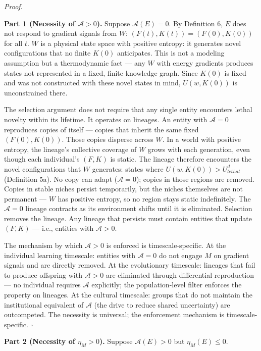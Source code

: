 \documentclass[
]{article}
\begin{document}
\emph{Proof.}

\textbf{Part 1 (Necessity of \(\mathcal{A} > 0\)).} Suppose
\(\mathcal{A}(E) = 0\). By Definition 6, \(E\) does not respond to
gradient signals from \(W\): \((F(t), K(t)) = (F(0), K(0))\) for all
\(t\). \(W\) is a physical state space with positive entropy: it
generates novel configurations that no finite \(K(0)\) anticipates. This
is not a modeling assumption but a thermodynamic fact --- any \(W\) with
energy gradients produces states not represented in a fixed, finite
knowledge graph. Since \(K(0)\) is fixed and was not constructed with
these novel states in mind, \(U(w, K(0))\) is unconstrained there.

The selection argument does not require that any single entity
encounters lethal novelty within its lifetime. It operates on lineages.
An entity with \(\mathcal{A} = 0\) reproduces copies of itself ---
copies that inherit the same fixed \((F(0), K(0))\). Those copies
disperse across \(W\). In a world with positive entropy, the lineage's
collective coverage of \(W\) grows with each generation, even though
each individual's \((F, K)\) is static. The lineage therefore encounters
the novel configurations that \(W\) generates: states where
\(U(w, K(0)) > U_{lethal}^d\) (Definition 5a). No copy can adapt
(\(\mathcal{A} = 0\)); copies in those regions are removed. Copies in
stable niches persist temporarily, but the niches themselves are not
permanent --- \(W\) has positive entropy, so no region stays static
indefinitely. The \(\mathcal{A} = 0\) lineage contracts as its
environment shifts until it is eliminated. Selection removes the lineage.
Any lineage that persists must contain entities that update \((F, K)\)
--- i.e., entities with \(\mathcal{A} > 0\).

The mechanism by which \(\mathcal{A} > 0\) is enforced is
timescale-specific. At the individual learning timescale: entities with
\(\mathcal{A} = 0\) do not engage \(M\) on gradient signals and are
directly removed. At the evolutionary timescale: lineages that fail to
produce offspring with \(\mathcal{A} > 0\) are eliminated through
differential reproduction --- no individual requires \(\mathcal{A}\)
explicitly; the population-level filter enforces the property on
lineages. At the cultural timescale: groups that do not maintain the
institutional equivalent of \(\mathcal{A}\) (the drive to reduce shared
uncertainty) are outcompeted. The necessity is universal; the
enforcement mechanism is timescale-specific. \(\square\)

\textbf{Part 2 (Necessity of \(\eta_M > 0\)).} Suppose
\(\mathcal{A}(E) > 0\) but \(\eta_M(E) \leq 0\).
\end{document}
